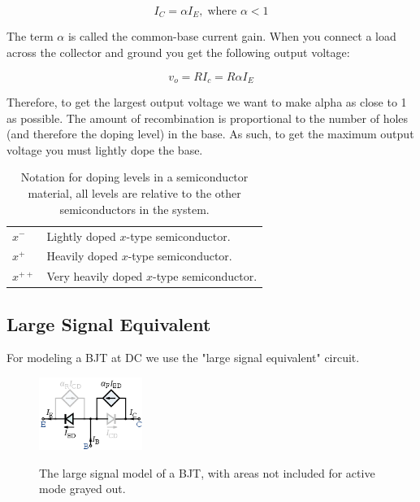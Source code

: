 \begin{equation*}
I_C = \alpha I_E,\; \textrm{where } \alpha < 1
\end{equation*}

The term $\alpha$ is called the common-base current gain. When you connect a load across the collector and ground you get the following output voltage:

\begin{equation*}
v_o = RI_c = R\alpha I_E
\end{equation*}

Therefore, to get the largest output voltage we want to make alpha as close to 1 as possible. The amount of recombination is proportional to the number of holes (and therefore the doping level) in the base. As such, to get the maximum output voltage you must lightly dope the base.

\begin{table}[H]
	\centering
	\caption{Notation for doping levels in a semiconductor material, all levels are relative to the other semiconductors in the system.}
    \begin{tabular}{ll}
    $x^-$ & Lightly doped $x$-type semiconductor. \\
    $x^+$  & Heavily doped $x$-type semiconductor. \\
    $x^{++}$  & Very heavily doped $x$-type semiconductor.
    \end{tabular}
\end{table}

\subsection{Large Signal Equivalent}

For modeling a BJT at DC we use the "large signal equivalent" circuit.

\begin{figure}[H]
\centering
\href{https://en.wikipedia.org/wiki/Bipolar_junction_transistor#/media/File:Approximated_Ebers_Moll.svg}{\includegraphics[width=0.3\textwidth]{images/large-signal.png}}
\caption{The large signal model of a BJT, with areas not included for active mode grayed out.}
\end{figure}

